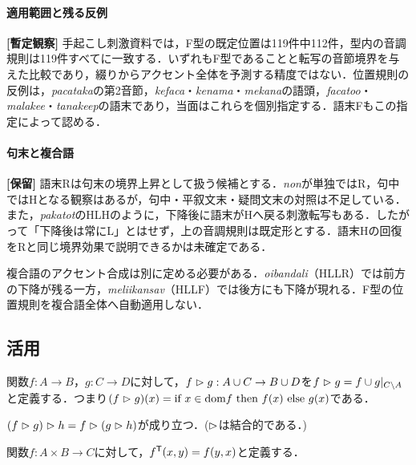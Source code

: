 \documentclass[../../main-detail.tex]{subfiles}
\begin{document}
\paragraph{適用範囲と残る反例}
\textbf{[暫定観察]} 手起こし刺激資料では，F型の既定位置は119件中112件，型内の音調規則は119件すべてに一致する．いずれもF型であることと転写の音節境界を与えた比較であり，綴りからアクセント全体を予測する精度ではない．位置規則の反例は，\textit{pacataka}の第2音節，\textit{kefaca}・\textit{kenama}・\textit{mekana}の語頭，\textit{facatoo}・\textit{malakee}・\textit{tanakeep}の語末であり，当面はこれらを個別指定する．語末Fもこの指定によって認める．


\paragraph{句末と複合語}
\textbf{[保留]} 語末Rは句末の境界上昇として扱う候補とする．\textit{non}が単独ではR，句中ではHとなる観察はあるが，句中・平叙文末・疑問文末の対照は不足している．また，\textit{pakatot}のHLHのように，下降後に語末がHへ戻る刺激転写もある．したがって「下降後は常にL」とはせず，上の音調規則は既定形とする．語末Hの回復をRと同じ境界効果で説明できるかは未確定である．

複合語のアクセント合成は別に定める必要がある．\textit{oibandali}（HLLR）では前方の下降が残る一方，\textit{meliikansav}（HLLF）では後方にも下降が現れる．F型の位置規則を複合語全体へ自動適用しない．

\subsection{活用}
\begin{definition}関数$f:A\rightarrow B$，$g:C\rightarrow D$に対して，$f\vartriangleright g:A\cup C \rightarrow B\cup D$を$f\vartriangleright g = f\cup g|_{C\backslash A}$と定義する．つまり$(f\vartriangleright g)(x) = \text{if }x\in \text{dom}f \text{ then }f(x) \text{ else }g(x)$である．
\end{definition}
\begin{proposition}
$(f\vartriangleright g)\vartriangleright h = f\vartriangleright(g\vartriangleright h)$が成り立つ．($\vartriangleright$は結合的である．)
\end{proposition}
\begin{definition}関数$f:A\times B\rightarrow C$に対して，$f^{\mathsf{T}}(x,y)=f(y,x)$と定義する．
\end{definition}
\end{document}
